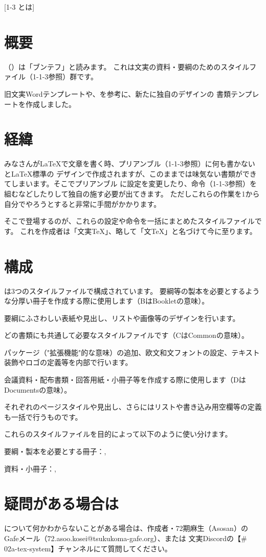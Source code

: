 \newpage
\pagestyle{leaflet}
[1-3 \BunTeX とは]
\inserttitlespace
\begin{multicols*}{2}
\section{概要}
\BunTeX （\BunTeXJ ）は「ブンテフ」と読みます。
これは文実の資料・要綱のためのスタイルファイル（1-1-3参照）群です。

旧文実Wordテンプレートや、を参考に、新たに独自のデザインの
書類テンプレートを作成しました。

\section{経緯}
みなさんが\LaTeX で文章を書く時、プリアンブル（1-1-3参照）に何も書かないと\LaTeX 標準の
デザインで作成されますが、このままでは味気ない書類ができてしまいます。そこでプリアンブル
に設定を変更したり、命令（1-1-3参照）を組むなどしたりして独自の施す必要が出てきます。
ただしこれらの作業を1から自分でやろうとすると非常に手間がかかります。

そこで登場するのが、これらの設定や命令を一括にまとめたスタイルファイルです。
これを作成者は「文実\TeX 」、略して「文\TeX 」と名づけて今に至ります。

\section{構成}
\BunTeX は3つのスタイルファイルで構成されています。
要綱等の製本を必要とするような分厚い冊子を作成する際に使用します（BはBookletの意味）。

要綱にふさわしい表紙や見出し、リストや画像等のデザインを行います。

どの書類にも共通して必要なスタイルファイルです（CはCommonの意味）。

パッケージ（"拡張機能"的な意味）の追加、欧文和文フォントの設定、テキスト装飾やロゴの定義等を内部で行います。

会議資料・配布書類・回答用紙・小冊子等を作成する際に使用します（DはDocumentsの意味）。

それぞれのページスタイルや見出し、さらにはリストや書き込み用空欄等の定義も一括で行うものです。

これらのスタイルファイルを目的によって以下のように使い分けます。
\begin{framebox-key}
\begin{reitemize}
    \item 要綱・製本を必要とする冊子：\BunTeXB , \BunTeXC
    \item 資料・小冊子：\BunTeXC , \BunTeXD
\end{reitemize}
\end{framebox-key}

\section{疑問がある場合は}
\BunTeX について何かわからないことがある場合は、作成者・72期麻生（Asosan）のGafeメール（72.asoo.kosei@tsukukoma-gafe.org）、または
文実Discordの【\# 02a-tex-system】チャンネルにて質問してください。

\end{multicols*}